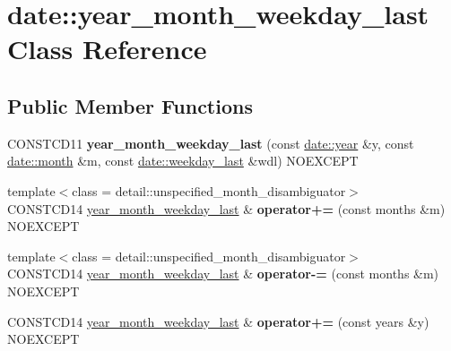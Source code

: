\hypertarget{classdate_1_1year__month__weekday__last}{}\section{date\+::year\+\_\+month\+\_\+weekday\+\_\+last Class Reference}
\label{classdate_1_1year__month__weekday__last}
\subsection*{Public Member Functions}
\begin{DoxyCompactItemize}
\item 
\mbox{\label{classdate_1_1year__month__weekday__last_a33b364cc472102ab50e9b536651d3baa}} 
C\+O\+N\+S\+T\+C\+D11 {\bfseries year\+\_\+month\+\_\+weekday\+\_\+last} (const \mbox{\hyperlink{classdate_1_1year}{date\+::year}} \&y, const \mbox{\hyperlink{classdate_1_1month}{date\+::month}} \&m, const \mbox{\hyperlink{classdate_1_1weekday__last}{date\+::weekday\+\_\+last}} \&wdl) N\+O\+E\+X\+C\+E\+PT
\item 
\mbox{\label{classdate_1_1year__month__weekday__last_a50f3b2e1c993bb7d5eb85286614bb5f3}} 
{\footnotesize template$<$class  = detail\+::unspecified\+\_\+month\+\_\+disambiguator$>$ }\\C\+O\+N\+S\+T\+C\+D14 \mbox{\hyperlink{classdate_1_1year__month__weekday__last}{year\+\_\+month\+\_\+weekday\+\_\+last}} \& {\bfseries operator+=} (const months \&m) N\+O\+E\+X\+C\+E\+PT
\item 
\mbox{\label{classdate_1_1year__month__weekday__last_aca31caa947ca9f205888e0260f35a180}} 
{\footnotesize template$<$class  = detail\+::unspecified\+\_\+month\+\_\+disambiguator$>$ }\\C\+O\+N\+S\+T\+C\+D14 \mbox{\hyperlink{classdate_1_1year__month__weekday__last}{year\+\_\+month\+\_\+weekday\+\_\+last}} \& {\bfseries operator-\/=} (const months \&m) N\+O\+E\+X\+C\+E\+PT
\item 
\mbox{\label{classdate_1_1year__month__weekday__last_ad220146cf9ad32c4a1c3bdcbf61ab64f}} 
C\+O\+N\+S\+T\+C\+D14 \mbox{\hyperlink{classdate_1_1year__month__weekday__last}{year\+\_\+month\+\_\+weekday\+\_\+last}} \& {\bfseries operator+=} (const years \&y) N\+O\+E\+X\+C\+E\+PT

\end{DoxyCompactItemize}
